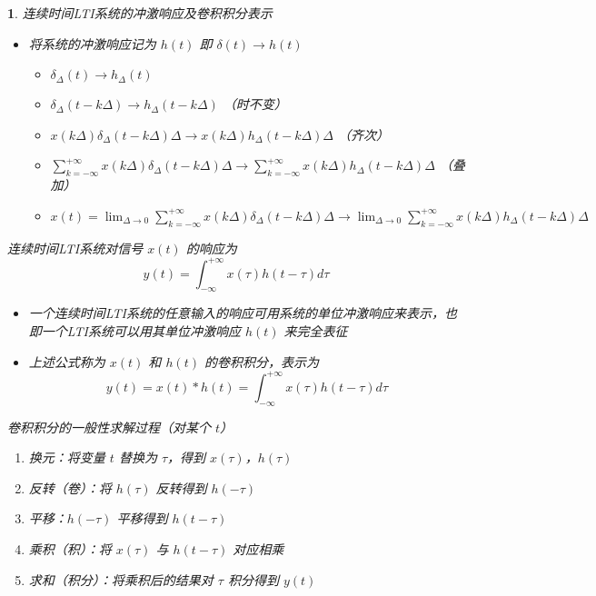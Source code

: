 \documentclass[UTF8]{report}
\theoremstyle{MyLineTheoremStyle} %
\theoremstyle{MyBlockTheoremStyle} %
\theoremstyle{MySubsubsectionStyle} %
\newtheorem{definition}{}
\begin{document}
\begin{definition}
    连续时间LTI系统的冲激响应及卷积积分表示
    \begin{itemize}
        \item 将系统的冲激响应记为 $h(t)$ 即 $\delta(t) \rightarrow h(t)$
        \begin{itemize}
            \item $\delta_\Delta(t) \rightarrow h_\Delta(t)$
            \item $\delta_\Delta(t - k\Delta) \rightarrow h_\Delta(t - k\Delta)$ （时不变）
            \item $x(k\Delta)\delta_\Delta(t - k\Delta) \Delta \rightarrow x(k\Delta)h_\Delta(t - k\Delta) \Delta$ （齐次）
            \item $\sum_{k=-\infty}^{+\infty} x(k\Delta) \delta_\Delta(t - k\Delta) \Delta \rightarrow \sum_{k=-\infty}^{+\infty} x(k\Delta) h_\Delta(t - k\Delta) \Delta$ （叠加）
            \item $x(t) = \lim_{\Delta \rightarrow 0} \sum_{k=-\infty}^{+\infty} x(k\Delta) \delta_\Delta(t - k\Delta) \Delta \rightarrow \lim_{\Delta \rightarrow 0} \sum_{k=-\infty}^{+\infty} x(k\Delta) h_\Delta(t - k\Delta) \Delta$
        \end{itemize}
    \end{itemize}

    \item 连续时间LTI系统对信号 $x(t)$ 的响应为
    \[
    y(t) = \int_{-\infty}^{+\infty} x(\tau) h(t - \tau) d\tau
    \]
    \begin{itemize}
        \item 一个连续时间LTI系统的任意输入的响应可用系统的单位冲激响应来表示，也即一个LTI系统可以用其单位冲激响应 $h(t)$ 来完全表征
        \item 上述公式称为 $x(t)$ 和 $h(t)$ 的卷积积分，表示为
        \[
        y(t) = x(t) * h(t) = \int_{-\infty}^{+\infty} x(\tau) h(t - \tau) d\tau
        \]
    \end{itemize}

    \item 卷积积分的一般性求解过程（对某个 $t$）
    \begin{enumerate}
        \item 换元：将变量 $t$ 替换为 $\tau$，得到 $x(\tau)$，$h(\tau)$
        \item 反转（卷）：将 $h(\tau)$ 反转得到 $h(-\tau)$
        \item 平移：$h(-\tau)$ 平移得到 $h(t - \tau)$
        \item 乘积（积）：将 $x(\tau)$ 与 $h(t - \tau)$ 对应相乘
        \item 求和（积分）：将乘积后的结果对 $\tau$ 积分得到 $y(t)$
    \end{enumerate}


\end{definition}
\end{document}

